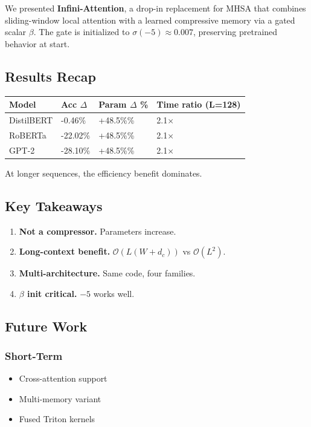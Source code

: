 We presented \textbf{Infini-Attention}, a drop-in replacement for MHSA that 
combines sliding-window local attention with a learned compressive memory 
via a gated scalar $\beta$. The gate is initialized to $\sigma(-5) \approx 0.007$, 
preserving pretrained behavior at start.

\subsection{Results Recap}

\begin{table}[H]
\centering
\small
\begin{tabular}{llll}
\toprule
\textbf{Model} & \textbf{Acc $\Delta$} & \textbf{Param $\Delta$ \%} & \textbf{Time ratio (L=128)} \\
\midrule
DistilBERT & -0.46\% & +48.5\%\% & 2.1$\times$ \\
RoBERTa & -22.02\% & +48.5\%\% & 2.1$\times$ \\
GPT-2 & -28.10\% & +48.5\%\% & 2.1$\times$ \\
\bottomrule
\end{tabular}
\end{table}

At longer sequences, the efficiency benefit dominates.

\subsection{Key Takeaways}

\begin{enumerate}
\item \textbf{Not a compressor.} Parameters increase.
\item \textbf{Long-context benefit.} $\mathcal{O}(L(W + d_c))$ vs $\mathcal{O}(L^2)$.
\item \textbf{Multi-architecture.} Same code, four families.
\item \textbf{$\beta$ init critical.} $-5$ works well.

\end{enumerate}
\subsection{Future Work}

\subsubsection{Short-Term}
\begin{itemize}
\item Cross-attention support
\item Multi-memory variant
\item Fused Triton kernels

\end{itemize}
